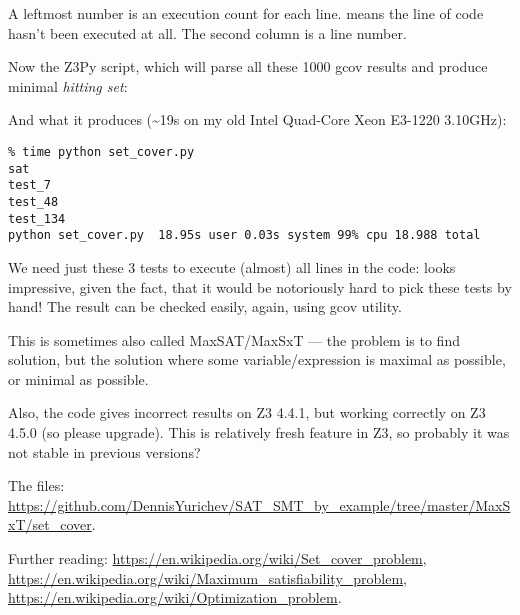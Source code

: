 A leftmost number is an execution count for each line.
\TT{\#\#\#\#\#} means the line of code hasn't been executed at all.
The second column is a line number.

Now the Z3Py script, which will parse all these 1000 gcov results and produce minimal \emph{hitting set}:



And what it produces (\textasciitilde{}19s on my old Intel Quad-Core Xeon E3-1220 3.10GHz):

\begin{lstlisting}
% time python set_cover.py
sat
test_7
test_48
test_134
python set_cover.py  18.95s user 0.03s system 99% cpu 18.988 total
\end{lstlisting}

We need just these 3 tests to execute (almost) all lines in the code:
looks impressive, given the fact, that it would be notoriously hard to pick these tests by hand!
The result can be checked easily, again, using gcov utility.

This is sometimes also called MaxSAT/MaxSxT --- the problem is to find solution,
but the solution where some variable/expression is maximal as possible, or minimal as possible.

Also, the code gives incorrect results on Z3 4.4.1, but working correctly on Z3 4.5.0 (so please upgrade).
This is relatively fresh feature in Z3, so probably it was not stable in previous versions?

The files: \url{https://github.com/DennisYurichev/SAT_SMT_by_example/tree/master/MaxSxT/set_cover}.

Further reading:
\url{https://en.wikipedia.org/wiki/Set_cover_problem},
\url{https://en.wikipedia.org/wiki/Maximum_satisfiability_problem},
\url{https://en.wikipedia.org/wiki/Optimization_problem}.

